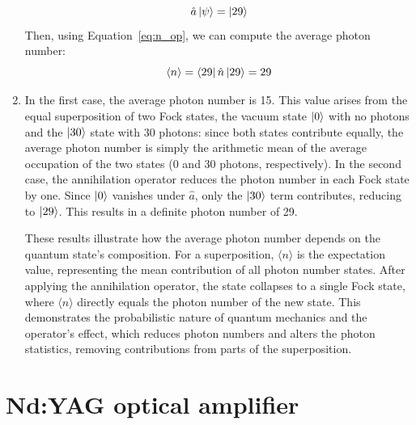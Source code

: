 \documentclass[prl, 11 pt]{revtex4-2}
\begin{document}
\begin{enumerate}
    $$
        \hat{a}\ket{\psi} = \ket{29}
    $$
    Then, using Equation~\eqref{eq:n_op}, we can compute the average photon number:
    $$
        \langle n \rangle = \bra{29} \hat{n} \ket{29} = 29
    $$
    \item  In the first case, the average photon number is 15. This value arises from the equal superposition of two Fock states, the vacuum state $\ket{0}$ with no photons and the $\ket{30}$ state with 30 photons: since both states contribute equally, the average photon number is simply the arithmetic mean of the average occupation of the two states (0 and 30 photons, respectively). In the second case, the annihilation operator reduces the photon number in each Fock state by one. Since $\ket{0}$ vanishes under $\hat{a}$, only the $\ket{30}$ term contributes, reducing to $\ket{29}$. This results in a definite photon number of 29.

    These results illustrate how the average photon number depends on the quantum state's composition. For a superposition, \(\langle n \rangle\) is the expectation value, representing the mean contribution of all photon number states. After applying the annihilation operator, the state collapses to a single Fock state, where \(\langle n \rangle\) directly equals the photon number of the new state. This demonstrates the probabilistic nature of quantum mechanics and the operator's effect, which reduces photon numbers and alters the photon statistics, removing contributions from parts of the superposition.

\end{enumerate}


\newpage
\section{Nd:YAG optical amplifier}
\end{document}
